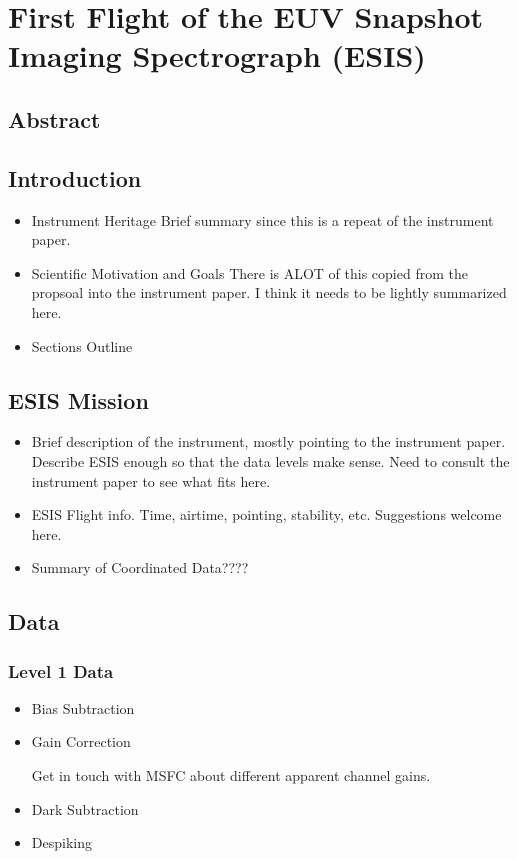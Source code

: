 \chapter{First Flight of the EUV Snapshot Imaging Spectrograph (ESIS)}

\section{Abstract}

\section{Introduction}
    \begin{itemize}
        \item Instrument Heritage
            Brief summary since this is a repeat of the instrument paper.
        \item Scientific Motivation and Goals
            There is ALOT of this copied from the propsoal into the instrument paper.  I think it needs to be lightly summarized here.
        \item Sections Outline
    \end{itemize}
    

\section{ESIS Mission}
    \begin{itemize}
        \item Brief description of the instrument, mostly pointing to the instrument paper.  Describe ESIS enough so that the data levels make sense. Need to consult the instrument paper to see what fits here. 
        \item ESIS Flight info.  Time, airtime, pointing, stability, etc.  Suggestions welcome here.
        \item Summary of Coordinated Data????
    \end{itemize}
	
\section{Data}

    \subsection{Level 1 Data}
        \begin{itemize}
            \item Bias Subtraction
            \item Gain Correction
         
            
                 Get in touch with MSFC about different apparent channel gains.
            \item Dark Subtraction
            \item Despiking
        \end{itemize}
       
